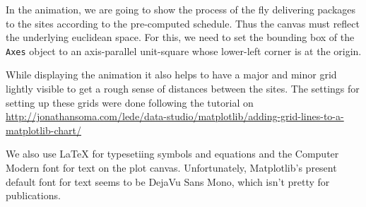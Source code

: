\documentclass[11.5pt]{report}
\begin{document}
\vspace{-0.8cm} \newchunk In the  animation, we are going to show the process of the fly delivering 
packages to the sites according to the pre-computed schedule. Thus the canvas must reflect the 
underlying euclidean space. For this, we need to set the bounding box of the \verb|Axes| object
to an axis-parallel unit-square whose lower-left corner is at the origin. 

While displaying the animation it also helps to have a major and minor grid lightly visible to 
get a rough sense of distances between the sites. The settings for setting up these grids were done following
the tutorial on \url{http://jonathansoma.com/lede/data-studio/matplotlib/adding-grid-lines-to-a-matplotlib-chart/}

We also use \LaTeX{} for typesetiing symbols and equations and the Computer Modern font 
for text on the plot canvas. Unfortunately, Matplotlib's present default font for text 
seems to be DejaVu Sans Mono, which isn't pretty for publications. 
\end{document}
